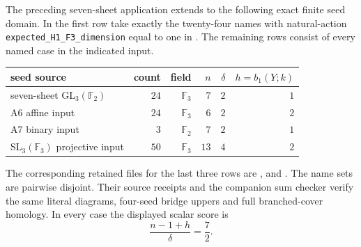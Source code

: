 \documentclass[11pt]{article}
\newcommand{\F}{\mathbb F}
\begin{document}
The preceding seven-sheet application extends to the following
exact finite seed domain. In the first row take exactly the
twenty-four names with natural-action
\texttt{expected\_H1\_F3\_dimension} equal to one in
. The remaining rows consist
of every named case in the indicated input.
\begin{center}\small
\begin{tabular}{lrrrrr}
\toprule
seed source & count & field & $n$ & $\delta$ & $h=b_1(Y;k)$\\
\midrule
seven-sheet GL$_3(\F_2)$ & $24$ & $\F_3$ & $7$ & $2$ & $1$\\
A6 affine input & $24$ & $\F_3$ & $6$ & $2$ & $2$\\
A7 binary input & $3$ & $\F_2$ & $7$ & $2$ & $1$\\
SL$_3(\F_3)$ projective input & $50$ & $\F_3$ & $13$ & $4$ & $2$\\
\bottomrule
\end{tabular}
\end{center}
The corresponding retained files for the last three rows are
,  and
.
The name sets are pairwise disjoint. Their source receipts and the
companion sum checker verify the same literal diagrams, four-seed
bridge uppers and full branched-cover homology.
In every case the displayed scalar score is
\[
                    \frac{n-1+h}{\delta}=\frac72.
\]
\end{document}
